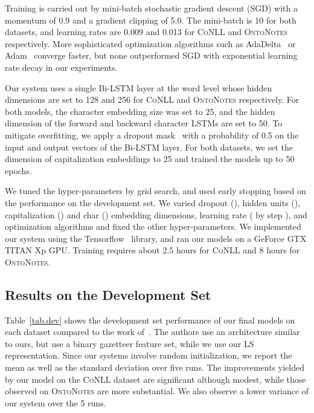 \documentclass[11pt]{article}
\newcommand{\conll}{\textsc{CoNLL}}
\newcommand{\onto}{\textsc{OntoNotes}}
\newcommand{\lr}{\textsc{LS}}
\begin{document}
	Training is carried out by mini-batch stochastic gradient descent (SGD) with a momentum of 0.9 and a gradient clipping of 5.0. The mini-batch is 10 for both datasets, and learning rates are 0.009 and 0.013 for \conll{} and \onto{} respectively. More sophisticated optimization algorithms such as AdaDelta~\cite{zeiler2012adadelta} or Adam~\cite{kingma2014adam} converge faster, but none outperformed  SGD with exponential learning rate decay in our experiments.  
	
	
	Our system uses a single Bi-LSTM layer at the word level whose hidden dimensions are set to 128 and 256 for \conll{} and \onto{} respectively. 	For both models, the character embedding size was set to 25, and the hidden dimension of the forward and backward character LSTMs are set to 50. To mitigate overfitting, we apply a dropout mask~\cite{srivastava2014dropout} with a probability of 0.5 on the input and output vectors of the Bi-LSTM layer. For both datasets, we set the dimension of capitalization embeddings to 25 and trained the models up to 50 epochs.
	
	We tuned the hyper-parameters by grid search, and used early stopping based on the performance on the development set. We varied dropout (), hidden units (), capitalization () and char () embedding dimensions, learning rate ( by step ), and optimization algorithms and fixed the other hyper-parameters. We implemented our system using the Tensorflow~\cite{abadi2016tensorflow} library, and ran our models on a GeForce GTX TITAN Xp GPU. Training requires about 2.5 hours for \conll{} and 8 hours for \onto{}. 
	
	\subsection{Results on the Development Set} 
	\label{sec:dev}

	Table~\ref{tab.dev} shows the development set performance of our final models on each dataset compared to the work of~. The authors use an architecture similar to ours, but use a binary gazetteer feature set, while we use our \lr{}  representation. Since our systems involve random initialization, we report the mean as well as the standard deviation over five runs. The improvements yielded by our model on the \conll{} dataset are significant although modest, while those observed on \onto{} are more substantial. We also observe a lower variance of our system over the 5 runs. 
	
\end{document}
